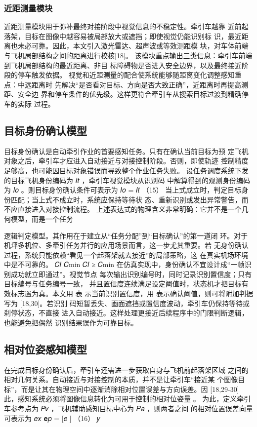 \subsubsection{近距测量模块}
近距测量模块用于弥补最终对接阶段中视觉信息的不稳定性。牵引车越靠
近前起落架，目标在图像中越容易被局部放大或遮挡；即使视觉仍能识别标
识，最近距离也未必可靠。因此，本文引入激光雷达、超声波或等效测距模
块，对车体前端与飞机局部结构之间的距离进行校核[18]。
该模块重点输出三类信息：牵引车前端到飞机局部结构的最近距离、非目
标障碍物是否进入安全边界，以及最终接近阶段的停车触发依据。
视觉和近距测量的配合使系统能够随距离变化调整感知重点：中远距离时
先解决“是否看对目标、方向是否大致正确”，近距离时再提高测距、安全边
界和停车条件的优先级。这样更符合牵引车从搜索目标过渡到精确停车的实际
过程。


\subsection{目标身份确认模型}
目标身份确认是自动牵引作业的首要感知任务。只有在确认当前目标为预
定飞机对象之后，牵引车才应进入自动接近与对接控制阶段。否则，即使轨迹
控制精度足够高，也可能因目标对象错误而导致整个作业任务失败。
设任务调度系统下发的目标飞机身份编码为 𝐼𝑡 ，牵引车视觉模块从识别码
中解算得到的观测身份编码为 𝐼𝑜 。则目标身份确认条件可表示为
𝐼𝑜 = 𝐼𝑡        （15）
当上式成立时，判定目标身份匹配；当上式不成立时，系统应保持等待状
态、重新识别或发出异常警告，而不应直接进入对接控制流程。
上述表达式的物理含义非常明确：它并不是一个几何模型，而是一个任务







逻辑判定模型。其作用在于建立从“任务分配”到“目标确认”的第一道闭
环。对于机坪多机位、多牵引任务并行的应用场景而言，这一步尤其重要。若
无身份确认过程，系统只能依赖“看见一个起落架就去接近”的局部策略，这
在真实机场环境中是不可靠的。
𝐶𝐼 𝐶min 𝐶𝐼 ≥ 𝐶min
在仿真实现中，身份确认不宜设计成“一帧识别成功就立即通过”。视觉节点
每次输出识别编号时，同时记录识别置信度；只有目标编号与任务编号一致，
并且置信度连续满足设定阈值时，状态机才把目标有效标志置为真。本文用 表
示当前识别置信度，用 表示确认阈值，则可将附加判据写为 [18,30]。若识别
码短暂丢失、画面遮挡或置信度波动，牵引车仍保持等待或刹停状态，不直接
进入自动接近。这样处理更接近后续程序中的门限判断逻辑，也能避免把偶然
识别结果误作为可靠目标。
\subsection{相对位姿感知模型}
在完成目标身份确认后，牵引车还需进一步获取自身与飞机前起落架区域
之间的相对几何关系。自动接近与对接控制的本质，并不是让牵引车“接近某
个图像目标”，而是让其在物理空间中逐渐消除相对位置误差与方向误差。因
[18,29-30]
此，感知系统必须将图像信息转化为可用于控制的相对位姿量                       。
为此，定义牵引车参考点为 𝑃𝑣 ，飞机辅助感知目标中心为 𝑃𝑎 ，则两者之间
的相对位置误差向量可表示为
𝑒𝑥
𝐞𝑝 = [𝑒 ]                      （16）
𝑦

